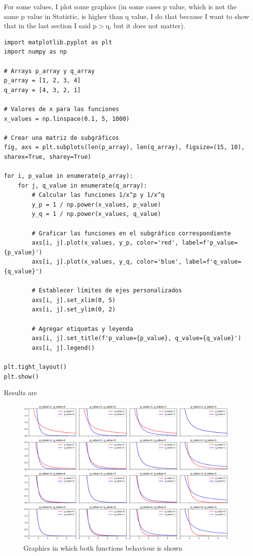 \documentclass{article}
\begin{document}
For some values, I plot some graphics (in some cases p value, which is not the same p value in Statistic, is higher than q value, I do that because I want to show that in the last section I said p\(>\)q, but it does not matter).

\begin{verbatim}
import matplotlib.pyplot as plt
import numpy as np

# Arrays p_array y q_array
p_array = [1, 2, 3, 4]
q_array = [4, 3, 2, 1]

# Valores de x para las funciones
x_values = np.linspace(0.1, 5, 1000)

# Crear una matriz de subgráficos
fig, axs = plt.subplots(len(p_array), len(q_array), figsize=(15, 10), sharex=True, sharey=True)

for i, p_value in enumerate(p_array):
    for j, q_value in enumerate(q_array):
        # Calcular las funciones 1/x^p y 1/x^q
        y_p = 1 / np.power(x_values, p_value)
        y_q = 1 / np.power(x_values, q_value)
        
        # Graficar las funciones en el subgráfico correspondiente
        axs[i, j].plot(x_values, y_p, color='red', label=f'p_value={p_value}')
        axs[i, j].plot(x_values, y_q, color='blue', label=f'q_value={q_value}')
        
        # Establecer límites de ejes personalizados
        axs[i, j].set_xlim(0, 5)
        axs[i, j].set_ylim(0, 2)
        
        # Agregar etiquetas y leyenda
        axs[i, j].set_title(f'p_value={p_value}, q_value={q_value}')
        axs[i, j].legend()

plt.tight_layout()
plt.show()
\end{verbatim}

Results are

\begin{figure}[h]
  \centering
  \includegraphics[width=1.3\textwidth]{graficas.png}
  \caption{Graphics in which both functions behaviour is shown}
  \label{fig:etiqueta}
\end{figure}
\end{document}
